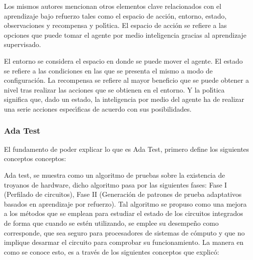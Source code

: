\begin{itemize}
	      Los mismos autores mencionan otros elementos clave relacionados con el
	      aprendizaje bajo refuerzo tales como el espacio de acci\'on, entorno, estado,
	      observaciones y recompensa y pol\'{\i}tica. El espacio de acci\'on se refiere a las
	      opciones que puede tomar el agente por medio inteligencia gracias al
	      aprendizaje supervisado. \parencite{Janiesch2021}

	      El entorno se considera el espacio en donde se puede mover el agente. El
	      estado se refiere a las condiciones en las que se presenta el mismo a modo
	      de configuraci\'on. La recompensa se refiere al mayor beneficio que se puede
	      obtener a nivel tras realizar las acciones que se obtienen en el entorno. Y
	      la pol\'{\i}tica significa que, dado un estado, la inteligencia por medio del
	      agente ha de realizar una serie acciones espec\'{\i}ficas de acuerdo con sus
	      posibilidades. \parencite{Chen2023}
\end{itemize}

\subsubsection{Ada Test}

El fundamento de poder explicar lo que es Ada Test, primero
define los siguientes conceptos conceptos:


Ada test, \textcite{Chen2023} se muestra como un algoritmo de pruebas sobre la
existencia de troyanos de hardware, dicho algoritmo pasa por las siguientes
fases: Fase I (Perfilado de circuitos), Fase II (Generaci\'on de patrones de
prueba adaptativos basados en aprendizaje por refuerzo). Tal algoritmo se
propuso como una mejora a los m\'etodos que se emplean para estudiar el estado de
los circuitos integrados de forma que cuando se est\'en utilizando, se emplee su
desempe\~no como corresponde, que sea seguro para procesadores de sistemas de
c\'omputo y que no implique desarmar el circuito para comprobar su funcionamiento.
La manera en como se conoce esto, es a trav\'es de los siguientes conceptos que
\textcite{Chen2023} explic\'o:

